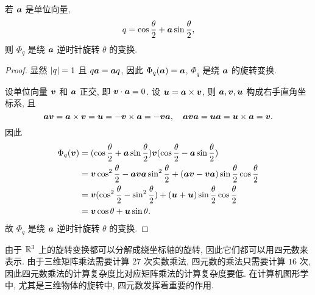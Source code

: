 \begin{theorem}
  若 $\bfa$ 是单位向量,
  \[
    q=\cos\frac\theta2+\bfa\sin\frac\theta2,
  \]
  则 $\Phi_q$ 是绕 $\bfa$ 逆时针旋转 $\theta$ 的变换.
\end{theorem}

\begin{proof}
  显然 $\abs{q}=1$ 且 $q\bfa=\bfa q$, 因此 $\Phi_q(\bfa)=\bfa$, $\Phi_q$ 是绕 $\bfa$ 的旋转变换.

  设单位向量 $\bfv$ 和 $\bfa$ 正交, 即 $\bfv\cdot \bfa=0$.
  设 $\bfu=\bfa\times\bfv$, 则 $\bfa,\bfv,\bfu$ 构成右手直角坐标系, 且
  \[
    \bfa\bfv=\bfa\times\bfv=\bfu=-\bfv\times\bfa=-\bfv\bfa,\quad
    \bfa\bfv\bfa=\bfu\bfa=\bfu\times\bfa=\bfv.
  \]
  因此
  \begin{align*}
    \Phi_q(\bfv)&
    =(\cos\frac\theta2+\bfa\sin\frac\theta2)\bfv 
      (\cos\frac\theta2-\bfa\sin\frac\theta2)\\&
    =\bfv\cos^2\frac\theta2-\bfa\bfv\bfa\sin^2\frac\theta2
      +(\bfa\bfv-\bfv\bfa)\sin\frac\theta2\cos\frac\theta2\\&
    =\bfv(\cos^2\frac\theta2-\sin^2\frac\theta2)
      +(\bfu+\bfu)\sin\frac\theta2\cos\frac\theta2\\&
    =\bfv\cos\theta+\bfu\sin\theta.
  \end{align*}
  故 $\Phi_q$ 是绕 $\bfa$ 逆时针旋转 $\theta$ 的变换.
\end{proof}

由于 $\BR^3$ 上的旋转变换都可以分解成绕坐标轴的旋转, 因此它们都可以用四元数来表示.
由于三维矩阵乘法需要计算 $27$ 次实数乘法, 四元数的乘法只需要计算 $16$ 次, 因此四元数乘法的计算复杂度比对应矩阵乘法的计算复杂度要低.
在计算机图形学中, 尤其是三维物体的旋转中, 四元数发挥着重要的作用.



